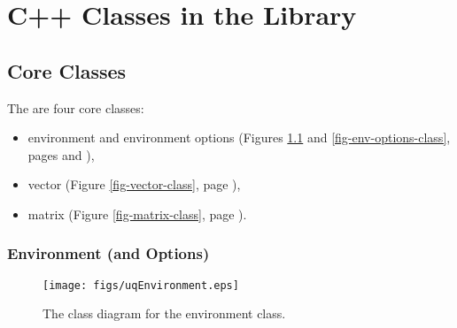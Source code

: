 \chapter{C++ Classes in the Library}\label{ch-classes}
\thispagestyle{headings}



\section{Core Classes}

The are four core classes:
\begin{itemize}
\item environment and environment options (Figures \ref{fig-env-class} and \ref{fig-env-options-class}, pages \pageref{fig-env-class} and \pageref{fig-env-options-class}),
\item vector (Figure \ref{fig-vector-class}, page \pageref{fig-vector-class}),
\item matrix (Figure \ref{fig-matrix-class}, page \pageref{fig-matrix-class}).
\end{itemize}

\clearpage
\subsection{Environment (and Options)}

\begin{figure}[h!]
\begin{center}
\texttt{[image: figs/uqEnvironment.eps]}
\end{center}
\caption{
The class diagram for the environment class.
}
\label{fig-env-class}
\end{figure}

